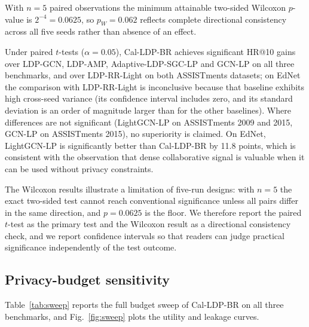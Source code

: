 \begin{table}[t]
\vspace{2pt}
{\footnotesize With $n=5$ paired observations the minimum attainable two-sided Wilcoxon $p$-value is $2^{-4}=0.0625$, so $p_W=0.062$ reflects complete directional consistency across all five seeds rather than absence of an effect.}
\end{table}

Under paired $t$-tests ($\alpha=0.05$), Cal-LDP-BR achieves significant HR@10 gains over LDP-GCN, LDP-AMP, Adaptive-LDP-SGC-LP and GCN-LP on all three benchmarks, and over LDP-RR-Light on both ASSISTments datasets; on EdNet the comparison with LDP-RR-Light is inconclusive because that baseline exhibits high cross-seed variance (its confidence interval includes zero, and its standard deviation is an order of magnitude larger than for the other baselines). Where differences are not significant (LightGCN-LP on ASSISTments 2009 and 2015, GCN-LP on ASSISTments 2015), no superiority is claimed. On EdNet, LightGCN-LP is significantly better than Cal-LDP-BR by 11.8 points, which is consistent with the observation that dense collaborative signal is valuable when it can be used without privacy constraints.

The Wilcoxon results illustrate a limitation of five-run designs: with $n=5$ the exact two-sided test cannot reach conventional significance unless all pairs differ in the same direction, and $p=0.0625$ is the floor. We therefore report the paired $t$-test as the primary test and the Wilcoxon result as a directional consistency check, and we report confidence intervals so that readers can judge practical significance independently of the test outcome.

\subsection{Privacy-budget sensitivity}\label{sec:sweep}

Table~\ref{tab:sweep} reports the full budget sweep of Cal-LDP-BR on all three benchmarks, and Fig.~\ref{fig:sweep} plots the utility and leakage curves.

